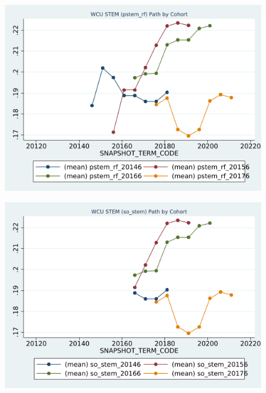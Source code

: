 \begin{figure}[h!]
\begin{centering}
\includegraphics[scale=1]{"figures/WCU_pstem_rf_path_by_cohort_CAREER_STEM"}
\end{centering}
\end{figure}
\newpage
\begin{figure}[h!]
\begin{centering}
\includegraphics[scale=1]{"figures/WCU_so_stem_path_by_cohort_CAREER_STEM"}
\end{centering}
\end{figure}
